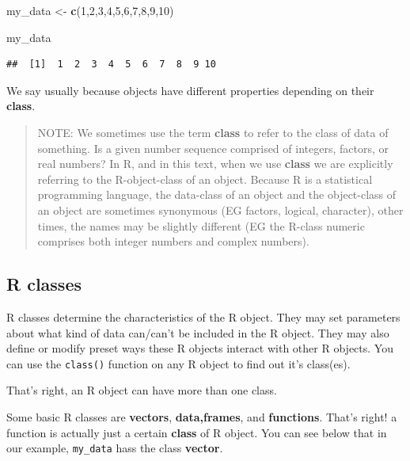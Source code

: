 \documentclass[
]{book}
\newenvironment{Shaded}{\begin{snugshade}}{\end{snugshade}}
\newcommand{\DecValTok}[1]{\textcolor[rgb]{0.00,0.00,0.81}{#1}}
\newcommand{\FunctionTok}[1]{\textcolor[rgb]{0.13,0.29,0.53}{\textbf{#1}}}
\newcommand{\NormalTok}[1]{#1}
\newcommand{\OtherTok}[1]{\textcolor[rgb]{0.56,0.35,0.01}{#1}}
\begin{document}
\begin{Shaded}
\begin{Highlighting}[]
\NormalTok{my\_data }\OtherTok{\textless{}{-}} \FunctionTok{c}\NormalTok{(}\DecValTok{1}\NormalTok{,}\DecValTok{2}\NormalTok{,}\DecValTok{3}\NormalTok{,}\DecValTok{4}\NormalTok{,}\DecValTok{5}\NormalTok{,}\DecValTok{6}\NormalTok{,}\DecValTok{7}\NormalTok{,}\DecValTok{8}\NormalTok{,}\DecValTok{9}\NormalTok{,}\DecValTok{10}\NormalTok{)}



\NormalTok{my\_data}
\end{Highlighting}
\end{Shaded}

\begin{verbatim}
##  [1]  1  2  3  4  5  6  7  8  9 10
\end{verbatim}

We say usually because objects have different properties depending on their \textbf{class}.

\begin{quote}
NOTE: We sometimes use the term \textbf{class} to refer to the class of data of something. Is a given number sequence comprised of integers, factors, or real numbers? In R, and in this text, when we use \textbf{class} we are explicitly referring to the R-object-class of an object. Because R is a statistical programming language, the data-class of an object and the object-class of an object are sometimes synonymous (EG factors, logical, character), other times, the names may be slightly different (EG the R-class numeric comprises both integer numbers and complex numbers).
\end{quote}

\hypertarget{r-classes}{%
\subsection{R classes}\label{r-classes}}

R classes determine the characteristics of the R object. They may set parameters about what kind of data can/can't be included in the R object. They may also define or modify preset ways these R objects interact with other R objects. You can use the \texttt{class()} function on any R object to find out it's class(es).

That's right, an R object can have more than one class.

Some basic R classes are \textbf{vectors}, \textbf{data,frames}, and \textbf{functions}. That's right! a function is actually just a certain \textbf{class} of R object. You can see below that in our example, \texttt{my\_data} hass the class \textbf{vector}.
\end{document}
